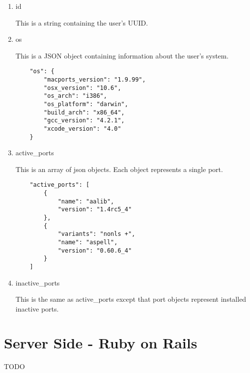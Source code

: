 \documentclass[10pt]{article}
\begin{document}
\begin{enumerate}
  \item id
  
  This is a string containing the user's UUID.
  
  \item os
  
  This is a JSON object containing information about the user's system.
  
  \begin{verbatim}
    "os": {
        "macports_version": "1.9.99",
        "osx_version": "10.6",
        "os_arch": "i386",
        "os_platform": "darwin",
        "build_arch": "x86_64",
        "gcc_version": "4.2.1",
        "xcode_version": "4.0"
    }
  \end{verbatim}
  
  \item active\_ports
  
  This is an array of json objects. Each object represents a single port.
  
  \begin{verbatim}
    "active_ports": [
        {
            "name": "aalib",
            "version": "1.4rc5_4"
        },
        {
            "variants": "nonls +",
            "name": "aspell",
            "version": "0.60.6_4"
        }
    ]
  \end{verbatim}
  
  \item inactive\_ports
  
  This is the same as active\_ports except that port objects represent installed inactive ports.
\end{enumerate}

\section{Server Side - Ruby on Rails}
TODO
\end{document}
